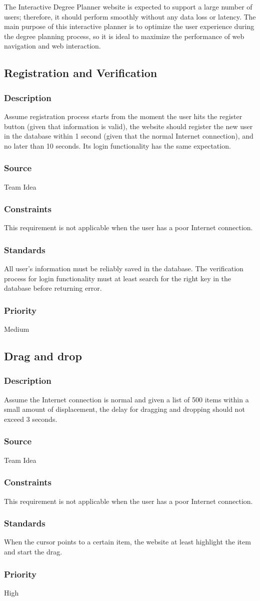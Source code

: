 The Interactive Degree Planner website is expected to support a large number of users; therefore, it should perform smoothly without any data loss or latency. The main purpose of this interactive planner is to optimize the user experience during the degree planning process, so it is ideal to maximize the performance of web navigation and web interaction.

\subsection{Registration and Verification}
\subsubsection{Description}
Assume registration process starts from the moment the user hits the register button (given that information is valid), the website should register the new user in the database within 1 second (given that the normal Internet connection), and no later than 10 seconds. Its login functionality has the same expectation.
\subsubsection{Source}
Team Idea
\subsubsection{Constraints}
This requirement is not applicable when the user has a poor Internet connection.
\subsubsection{Standards}
All user's information must be reliably saved in the database. The verification process for login functionality must at least search for the right key in the database before returning error.
\subsubsection{Priority}
Medium

\subsection{Drag and drop}
\subsubsection{Description}
Assume the Internet connection is normal and given a list of 500 items within a small amount of displacement, the delay for dragging and dropping should not exceed 3 seconds.
\subsubsection{Source}
Team Idea
\subsubsection{Constraints}
This requirement is not applicable when the user has a poor Internet connection.
\subsubsection{Standards}
When the cursor points to a certain item, the website at least highlight the item and start the drag.
\subsubsection{Priority}
High